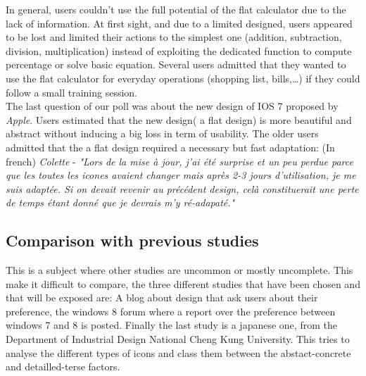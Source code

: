 \documentclass[a4paper,11pt] {article}
\theoremstyle{definition}
\begin{document}
    In general, users couldn't use the full potential of the flat calculator due to the lack of information. At first sight, and due to a limited designed, users appeared to be lost and limited their actions to the simplest one (addition, subtraction, division, multiplication) instead of exploiting the dedicated function to compute percentage or solve basic equation. Several users admitted that they wanted to use the flat calculator for everyday operations (shopping list, bills,\ldots) if they could follow a small training session.\\
    
    The last question of our poll was about the new design of IOS 7 proposed by \textit{Apple}.
    Users estimated that the new design( a flat design) is more beautiful and abstract without inducing a big loss in term of 	usability. The older users admitted that the a flat design required a necessary but fast adaptation:
  	(In french) \textit{Colette} - \textit{"Lors de la mise à jour, j'ai été surprise et un peu perdue parce que les toutes les icones avaient changer mais après 2-3 jours d'utilisation, je me suis adaptée. Si on devait revenir au précédent design, celà constituerait une perte de temps étant donné que je devrais m'y ré-adapaté."}
    
    

    \subsection{Comparison with previous studies}
    This is a subject where other studies are uncommon or mostly uncomplete. This make it difficult to compare, the three different studies that have been chosen and that will be exposed are: A blog about design that ask users about their preference, the windows 8 forum where a report over the preference between windows 7 and 8 is posted. Finally the last study is a japanese one, from the Department of Industrial Design National Cheng Kung University. This tries to analyse the different types of icons and class them between the abstact-concrete and detailled-terse factors.
\end{document}
